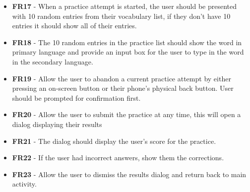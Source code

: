 \documentclass[runningheads]{llncs}
\begin{document}
\begin{subappendices}
\begin{itemize}
			\item \textbf{FR17} - When a practice attempt is started, the user should be presented with 10 random entries from their vocabulary list, if they don't have 10 entries it should show all of their entries.
			\item \textbf{FR18} - The 10 random entries in the practice list should show the word in primary language and provide an input box for the user to type in the word in the secondary language.
			\item \textbf{FR19} - Allow the user to abandon a current practice attempt by either pressing an on-screen button or their phone's physical back button. User should be prompted for confirmation first.
			\item \textbf{FR20} - Allow the user to submit the practice at any time, this will open a dialog displaying their results
			\item \textbf{FR21} - The dialog should display the user's score for the practice.
			\item \textbf{FR22} - If the user had incorrect answers, show them the corrections.
			\item \textbf{FR23} - Allow the user to dismiss the results dialog and return back to main activity.
		\end{itemize}
		

\end{subappendices}
\end{document}
